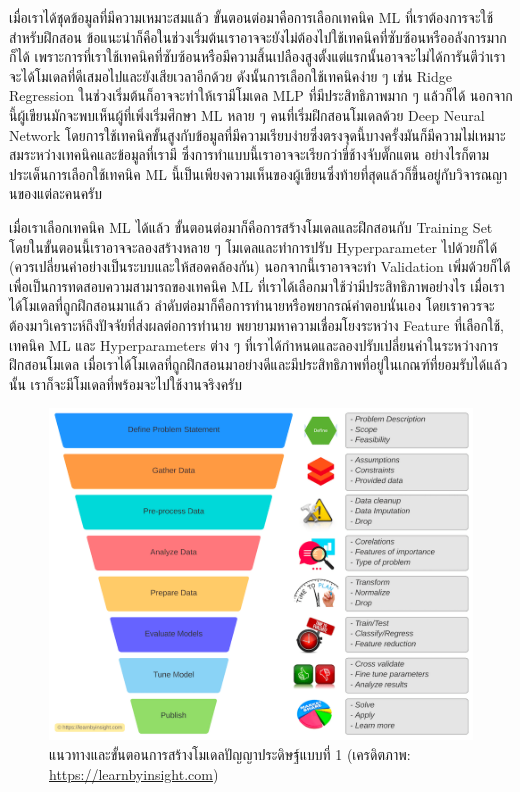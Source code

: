 เมื่อเราได้ชุดข้อมูลที่มีความเหมาะสมแล้ว ขั้นตอนต่อมาคือการเลือกเทคนิค ML ที่เราต้องการจะใช้สำหรับฝึกสอน ข้อแนะนำก็คือในช่วงเริ่มต้นเราอาจจะยังไม่ต้องไปใช้เทคนิคที่ซับซ้อนหรืออลังการมากก็ได้ เพราะการที่เราใช้เทคนิคที่ซับซ้อนหรือมีความสิ้นเปลืองสูงตั้งแต่แรกนั้นอาจจะไม่ได้การันตีว่าเราจะได้โมเดลที่ดีเสมอไปและยังเสียเวลาอีกด้วย ดังนั้นการเลือกใช้เทคนิคง่าย ๆ เช่น Ridge Regression ในช่วงเริ่มต้นก็อาจจะทำให้เรามีโมเดล MLP ที่มีประสิทธิภาพมาก ๆ แล้วก็ได้ นอกจากนี้ผู้เขียนมักจะพบเห็นผู้ที่เพิ่งเริ่มศึกษา ML หลาย ๆ คนที่เริ่มฝึกสอนโมเดลด้วย Deep Neural Network โดยการใช้เทคนิคขั้นสูงกับข้อมูลที่มีความเรียบง่ายซึ่งตรงจุดนี้บางครั้งมันก็มีความไม่เหมาะสมระหว่างเทคนิคและข้อมูลที่เรามี ซึ่งการทำแบบนี้เราอาจจะเรียกว่าขี่ช้างจับตั๊กแตน อย่างไรก็ตามประเด็นการเลือกใช้เทคนิค ML นี้เป็นเพียงความเห็นของผู้เขียนซึ่งท้ายที่สุดแล้วก็ขึ้นอยู่กับวิจารณญานของแต่ละคนครับ

เมื่อเราเลือกเทคนิค ML ได้แล้ว ขั้นตอนต่อมาก็คือการสร้างโมเดลและฝึกสอนกับ Training Set โดยในขั้นตอนนี้เราอาจจะลองสร้างหลาย ๆ โมเดลและทำการปรับ Hyperparameter ไปด้วยก็ได้ (ควรเปลี่ยนค่าอย่างเป็นระบบและให้สอดคล้องกัน) นอกจากนี้เราอาจจะทำ Validation เพิ่มด้วยก็ได้เพื่อเป็นการทดสอบความสามารถของเทคนิค ML ที่เราได้เลือกมาใช้ว่ามีประสิทธิภาพอย่างไร เมื่อเราได้โมเดลที่ถูกฝึกสอนมาแล้ว ลำดับต่อมาก็คือการทำนายหรือพยากรณ์คำตอบนั่นเอง โดยเราควรจะต้องมาวิเคราะห์ถึงปัจจัยที่ส่งผลต่อการทำนาย พยายามหาความเชื่อมโยงระหว่าง Feature ที่เลือกใช้, เทคนิค ML และ Hyperparameters ต่าง ๆ ที่เราได้กำหนดและลองปรับเปลี่ยนค่าในระหว่างการฝึกสอนโมเดล เมื่อเราได้โมเดลที่ถูกฝึกสอนมาอย่างดีและมีประสิทธิภาพที่อยู่ในเกณฑ์ที่ยอมรับได้แล้วนั้น เราก็จะมีโมเดลที่พร้อมจะไปใช้งานจริงครับ

\begin{figure}[H]
    \centering
    \includegraphics[width=0.9\linewidth]{fig/ml_workflow.png}
    \caption{แนวทางและขั้นตอนการสร้างโมเดลปัญญาประดิษฐ์แบบที่ 1 (เครดิตภาพ: \url{https://learnbyinsight.com})}
    \label{fig:ml_workflow}
\end{figure}

